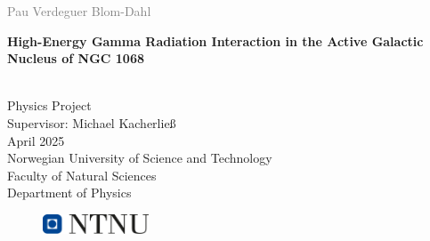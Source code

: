 \documentclass[a4paper, 12pt, oneside]{book} %
\begin{document}


\begin{titlepage}
\vspace*{1.5cm}

\noindent  \textcolor{gray}{\large Pau Verdeguer Blom-Dahl} \\
\vspace{1cm}

\noindent \textbf{\Large High-Energy Gamma Radiation Interaction in the Active Galactic Nucleus of NGC 1068} \\
\vspace{0.5cm}

 \\



\vspace{7cm}
\noindent Physics Project\\
Supervisor: Michael Kacherließ \\
April 2025 \\

\vspace{0.2cm}
\noindent Norwegian University of Science and Technology \\
Faculty of Natural Sciences \\
Department of Physics \\

\begin{figure}[h]
    \includegraphics[width=0.28\textwidth]{Figures/ntnu_basic.png}
\end{figure}
\end{titlepage}


\end{document}
